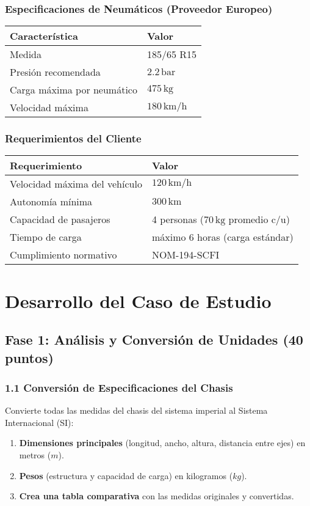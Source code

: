 \documentclass{article}
\begin{document}
\subsubsection*{Especificaciones de Neumáticos (Proveedor Europeo)}
\begin{tabular}{|l|l|}
\hline
\textbf{Característica} & \textbf{Valor} \\
\hline
Medida & 185/65 R15 \\
Presión recomendada & $2.2 \, \text{bar}$ \\
Carga máxima por neumático & $475 \, \text{kg}$ \\
Velocidad máxima & $180 \, \text{km/h}$ \\
\hline
\end{tabular}

\subsubsection*{Requerimientos del Cliente}
\begin{tabular}{|l|l|}
\hline
\textbf{Requerimiento} & \textbf{Valor} \\
\hline
Velocidad máxima del vehículo & $120 \, \text{km/h}$ \\
Autonomía mínima & $300 \, \text{km}$ \\
Capacidad de pasajeros & 4 personas ($70 \, \text{kg}$ promedio c/u) \\
Tiempo de carga & máximo 6 horas (carga estándar) \\
Cumplimiento normativo & NOM-194-SCFI \\
\hline
\end{tabular}

\section*{Desarrollo del Caso de Estudio}

\subsection*{Fase 1: Análisis y Conversión de Unidades (40 puntos)}

\subsubsection*{1.1 Conversión de Especificaciones del Chasis}
Convierte todas las medidas del chasis del sistema imperial al Sistema Internacional (SI):
\begin{enumerate}
    \item \textbf{Dimensiones principales} (longitud, ancho, altura, distancia entre ejes) en metros ($m$).
    \item \textbf{Pesos} (estructura y capacidad de carga) en kilogramos ($kg$).
    \item \textbf{Crea una tabla comparativa} con las medidas originales y convertidas.
\end{enumerate}
\end{document}
